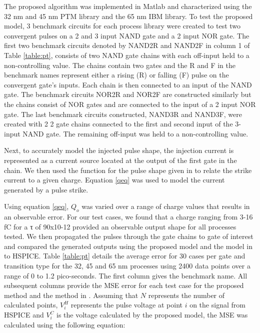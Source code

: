 The proposed algorithm was implemented in Matlab and characterized using the 32 nm and 45 nm PTM library \cite{PTM} and the 65 nm IBM library. To test the proposed model, 3 benchmark circuits for each process library were created to test two convergent pulses on a 2 and 3 input NAND gate and a 2 input NOR gate. The first two benchmark circuits denoted by NAND2R and NAND2F in column 1 of Table \ref{table:pt}, consists of two NAND gate chains with each off-input held to a non-controlling value. The chains contain two gates and the R and F in the benchmark names represent either a rising (R) or falling (F) pulse on the convergent gate’s inputs. Each chain is then connected to an input of the NAND gate. The benchmark circuits NOR2R and NOR2F are constructed similarly but the chains consist of NOR gates and are connected to the input of a 2 input NOR gate. The last benchmark circuits constructed, NAND3R and NAND3F, were created with 2 2 gate chains connected to the first and second input of the 3-input NAND gate. The remaining off-input was held to a non-controlling value. 

Next, to accurately model the injected pulse shape, the injection current is represented as a current source located at the output of the first gate in the chain. We then used the function for the pulse shape given in \cite{injeq} to relate the strike current to a given charge. Equation \ref{qeq} was used to model the current generated by a pulse strike.

Using equation \ref{qeq}, $Q_o$ was varied over a range of charge values that results in an observable error. For our test cases, we found that a charge ranging from 3-16 fC for a τ of 90x10-12 provided an observable output shape for all processes tested. We then propagated the pulses through the gate chains to gate of interest and compared the generated outputs using the proposed model and the model in \cite{Accurate_Masking} to HSPICE. Table \ref{table:pt} details the average error for 30 cases per gate and transition type for the 32, 45 and 65 nm processes using 2400 data points over a range of 0 to 1.2 pico-seconds. The first column gives the benchmark name. All subsequent columns provide the MSE error for each test case for the proposed method and the method in \cite{Accurate_Masking}. Assuming that $N$ represents the number of calculated points, $V_i^H$ represents the pulse voltage at point $i$ on the signal from HSPICE and $V_i^C$ is the voltage calculated by the proposed model, the MSE was calculated using the following equation:

